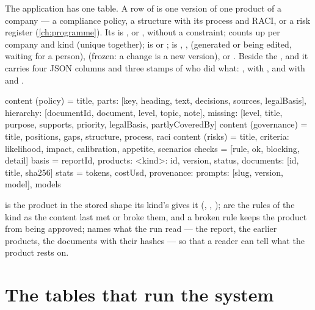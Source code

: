 The application  has one table. A row of  is one version of
one product of a company --- a compliance policy, a structure with its process and RACI, or a
risk register (\cref{ch:programme}). Its  is ,  or
, without a constraint;  counts up per company and kind (unique
together);  is  or ;  is ,
,  (generated or being edited, waiting for a person), 
(frozen: a change is a new version),  or . Beside the
,  and  it carries four JSON columns and three stamps of who
did what: ,  with , and 
with  and .

\begin{codeblock}
content (policy)     = {title,
                        parts: [{key, heading, text, decisions, sources,
                                 legalBasis}],
                        hierarchy: [{documentId, document, level, topic, note}],
                        missing: [{level, title, purpose, supports, priority,
                                   legalBasis, partlyCoveredBy}]}
content (governance) = {title, positions, gaps, structure, process, raci}
content (risks)      = {title, criteria: {likelihood, impact, calibration},
                        appetite, scenarios}
checks = [{rule, ok, blocking, detail}]
basis  = {reportId, products: {<kind>: {id, version, status}},
          documents: [{id, title, sha256}]}
stats  = {tokens, costUsd, provenance: {prompts: [{slug, version, model}],
                                        models}}
\end{codeblock}

 is the product in the stored shape its kind's  gives it
(, , );  are the
rules of the kind as the content last met or broke them, and a broken  rule
keeps the product from being approved;  names what the run read --- the report,
the earlier products, the documents with their hashes --- so that a reader can tell what the
product rests on.

\section{The tables that run the system}\label{sec:data:ops}

